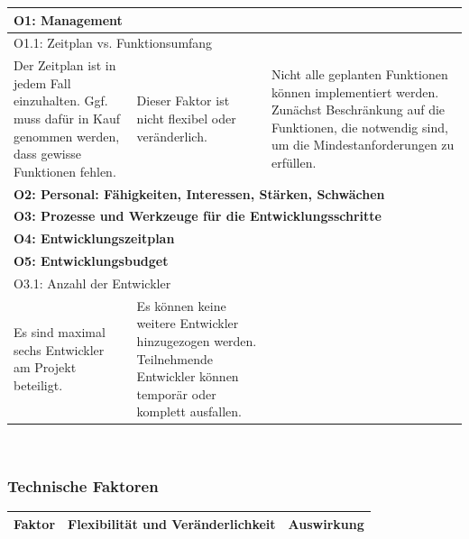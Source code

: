 \documentclass[fontsize=12pt,paper=a4,twoside]{scrartcl}
\begin{document}
\begin{tabularx}{\textwidth}{|p{3.5cm}|X|X|}
\hline
\multicolumn{3}{|l|}{\textbf{O1: Management}}\\\hline
\multicolumn{3}{|l|}{O1.1: Zeitplan vs. Funktionsumfang}\\\hline
Der Zeitplan ist in jedem Fall einzuhalten. Ggf. muss dafür in Kauf genommen werden, dass gewisse Funktionen fehlen. & Dieser Faktor ist nicht flexibel oder veränderlich. & Nicht alle geplanten Funktionen können implementiert werden. Zunächst Beschränkung auf die Funktionen, die notwendig sind, um die Mindestanforderungen zu erfüllen.\\\hline

\multicolumn{3}{|l|}{\textbf{O2: Personal: Fähigkeiten, Interessen, Stärken, Schwächen}}\\\hline

\multicolumn{3}{|l|}{\textbf{O3: Prozesse und Werkzeuge für die Entwicklungsschritte}}\\\hline

\multicolumn{3}{|l|}{\textbf{O4: Entwicklungszeitplan}}\\\hline

\multicolumn{3}{|l|}{\textbf{O5: Entwicklungsbudget}}\\\hline
\multicolumn{3}{|l|}{O3.1: Anzahl der Entwickler}\\\hline
Es sind maximal sechs Entwickler am Projekt beteiligt. & Es können keine weitere Entwickler hinzugezogen werden. Teilnehmende Entwickler können temporär oder komplett ausfallen. & \\\hline
\end{tabularx}\\

\subsubsection{Technische Faktoren}
\begin{tabularx}{\textwidth}{|p{3.5cm}|X|X|}
\hline
\textbf{Faktor} & \textbf{Flexibilität und Veränderlichkeit} & \textbf{Auswirkung}\\\hline
\end{tabularx}\newline
\end{document}

